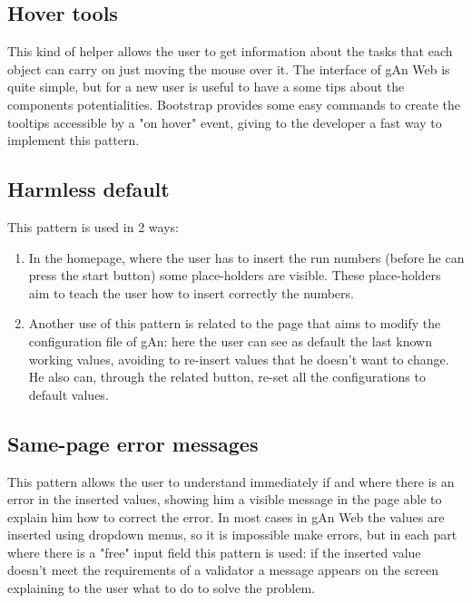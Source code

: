 \subsection{Hover tools}

This kind of helper allows the user to get information about the tasks that each object can carry on just moving the mouse over it. 
The interface of gAn Web is quite simple, but for a new user is useful to have a some tips about the components potentialities. Bootstrap provides some easy commands to create the tooltips accessible by a "on hover" event, giving to the developer a fast way to implement this pattern.

\subsection{Harmless default}

This pattern is used in 2 ways:
\begin{enumerate}

\item In the homepage, where the user has to insert the run numbers (before he can press the start button) some place-holders are visible. 
These place-holders aim to teach the user how to insert correctly the numbers.

\item Another use of this pattern is related to the page that aims to modify the configuration file of gAn: here the user can see as default the last known working values, avoiding to re-insert values that he doesn't want to change. He also can, through the related  button, re-set all the configurations to default values.

\end{enumerate}

\subsection{Same-page error messages}

This pattern allows the user to understand immediately if and where there is an error in the inserted values, showing him a visible message in the page able to explain him how to correct the error. In most cases in gAn Web the values are inserted using dropdown menus, so it is impossible make errors, but in each part where there is a "free" input field this pattern is used: if the inserted value doesn't meet the requirements of a validator a message appears on the screen explaining to the user what to do to solve the problem.

